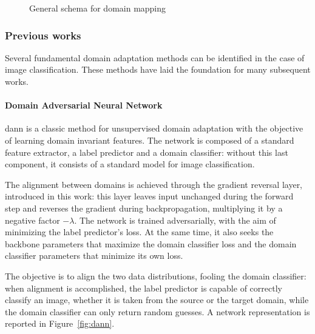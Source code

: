 \documentclass[%
    corpo=12pt,
    twoside,
    stile=classica,   
    tipotesi=magistrale,
    evenboxes,
    english,
	numerazioneromana,
]{toptesi}
\begin{document}
\begin{figure}[ht]
	\centering
	\caption{General schema for domain mapping\cite{wilson2020survey}}
	\label{fig:gan}
\end{figure}


\subsubsection{Previous works}
Several fundamental domain adaptation methods can be identified in the case of image classification. These methods have laid the foundation for many subsequent works.

\paragraph{Domain Adversarial Neural Network}\label{sec:dann}
\gls{dann}\cite{ganin2015unsupervised} is a classic method for unsupervised domain adaptation with the objective of learning domain invariant features. The network is composed of a standard feature extractor, a label predictor and a domain classifier: without this last component, it consists of a standard model for image classification.

The alignment between domains is achieved through the gradient reversal layer, introduced in this work: this layer leaves input unchanged during the forward step and reverses the gradient during backpropagation, multiplying it by a negative factor $-\lambda$. The network is trained adversarially, with the aim of minimizing the label predictor’s loss. 
At the same time, it also seeks the backbone parameters that maximize the domain classifier loss and the domain classifier parameters that minimize its own loss.

The objective is to align the two data distributions, fooling the domain classifier: when alignment is accomplished, the label predictor is capable of correctly classify an image, whether it is taken from the source or the target domain, while the domain classifier can only return random guesses. A network representation is reported in Figure~\ref{fig:dann}.
\end{document}
